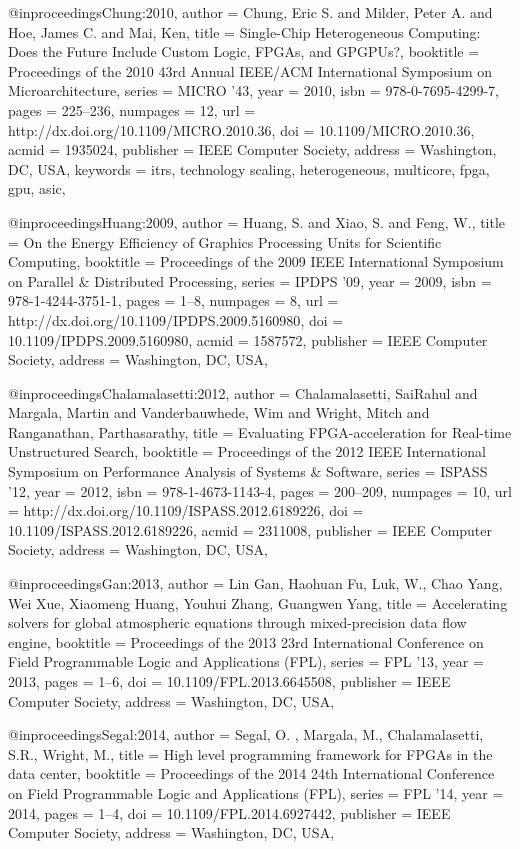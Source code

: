 @inproceedings{Chung:2010,
 author = {Chung, Eric S. and Milder, Peter A. and Hoe, James C. and Mai, Ken},
 title = {Single-Chip Heterogeneous Computing: Does the Future Include Custom Logic, FPGAs, and GPGPUs?},
 booktitle = {Proceedings of the 2010 43rd Annual IEEE/ACM International Symposium on Microarchitecture},
 series = {MICRO '43},
 year = {2010},
 isbn = {978-0-7695-4299-7},
 pages = {225--236},
 numpages = {12},
 url = {http://dx.doi.org/10.1109/MICRO.2010.36},
 doi = {10.1109/MICRO.2010.36},
 acmid = {1935024},
 publisher = {IEEE Computer Society},
 address = {Washington, DC, USA},
 keywords = {itrs, technology scaling, heterogeneous, multicore, fpga, gpu, asic},
} 

@inproceedings{Huang:2009,
 author = {Huang, S. and Xiao, S. and Feng, W.},
 title = {On the Energy Efficiency of Graphics Processing Units for Scientific Computing},
 booktitle = {Proceedings of the 2009 IEEE International Symposium on Parallel \& Distributed Processing},
 series = {IPDPS '09},
 year = {2009},
 isbn = {978-1-4244-3751-1},
 pages = {1--8},
 numpages = {8},
 url = {http://dx.doi.org/10.1109/IPDPS.2009.5160980},
 doi = {10.1109/IPDPS.2009.5160980},
 acmid = {1587572},
 publisher = {IEEE Computer Society},
 address = {Washington, DC, USA},
} 

@inproceedings{Chalamalasetti:2012,
 author = {Chalamalasetti, SaiRahul and Margala, Martin and Vanderbauwhede, Wim and Wright, Mitch and Ranganathan, Parthasarathy},
 title = {Evaluating FPGA-acceleration for Real-time Unstructured Search},
 booktitle = {Proceedings of the 2012 IEEE International Symposium on Performance Analysis of Systems \& Software},
 series = {ISPASS '12},
 year = {2012},
 isbn = {978-1-4673-1143-4},
 pages = {200--209},
 numpages = {10},
 url = {http://dx.doi.org/10.1109/ISPASS.2012.6189226},
 doi = {10.1109/ISPASS.2012.6189226},
 acmid = {2311008},
 publisher = {IEEE Computer Society},
 address = {Washington, DC, USA},
} 

@inproceedings{Gan:2013,
 author = {Lin Gan, Haohuan Fu, Luk, W., Chao Yang,  Wei Xue, Xiaomeng Huang, Youhui Zhang, Guangwen Yang},
 title = {Accelerating solvers for global atmospheric equations through mixed-precision data flow engine},
 booktitle = {Proceedings of the 2013 23rd International Conference on Field Programmable Logic and Applications (FPL)},
 series = {FPL '13},
 year = {2013},
 pages = {1--6},
 doi = {10.1109/FPL.2013.6645508},
 publisher = {IEEE Computer Society},
 address = {Washington, DC, USA},
} 

@inproceedings{Segal:2014,
 author = {Segal, O. , Margala, M., Chalamalasetti, S.R., Wright, M.},
 title = {High level programming framework for FPGAs in the data center},
 booktitle = {Proceedings of the 2014 24th International Conference on Field Programmable Logic and Applications (FPL)},
 series = {FPL '14},
 year = {2014},
 pages = {1--4},
 doi = {10.1109/FPL.2014.6927442},
 publisher = {IEEE Computer Society},
 address = {Washington, DC, USA},
} 

